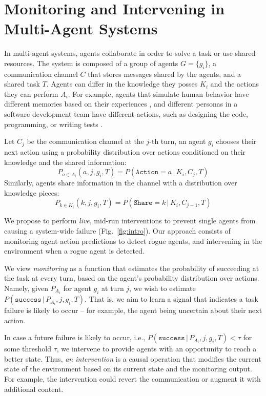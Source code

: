 \section{Monitoring and Intervening in Multi-Agent Systems}
\label{sec:method}

In multi-agent systems, agents collaborate in order to solve a task or use shared resources.
The system is composed of a group of agents $G=\{g_i\}$, a communication channel $C$ that stores messages shared by the agents, and a shared task $T$. Agents can differ in the knowledge they posses $K_i$ and the actions they can perform $A_i$. 
For example, agents that simulate human behavior have different memories based on their experiences \cite{10.1145/3586183.3606763}, and different personas in a software development team have different actions, such as designing the code, programming, or writing tests \cite{qian-etal-2024-chatdev}.

Let $C_j$ be the communication channel at the $j$-th turn, an agent $g_i$ chooses their next action using a probability distribution over actions conditioned on their knowledge and the shared information: 
\[P_{a \in A_i}(a, j, g_{i}, T)=P(\texttt{Action}=a \,|\, K_i, C_j, T)\]
Similarly, agents share information in the channel with a distribution over knowledge pieces:
\[P_{k \in K_i}(k, j, g_{i}, T)=P(\texttt{Share}=k \,|\, K_i, C_{j-1}, T)\]

We propose to perform \emph{live}, mid-run interventions to prevent single agents from causing a system-wide failure (Fig.~\ref{fig:intro}). Our approach consists of monitoring agent action predictions to detect rogue agents, and intervening in the environment when a rogue agent is detected.

We view \textit{monitoring} as a function that estimates the probability of succeeding at the task at every turn, based on the agent's probability distribution over actions.
Namely, given $P_{A_i}$ for agent $g_i$ at turn $j$, we wish to estimate $P(\texttt{success} \,|\, P_{A_i}, j, g_i, T)$. 
That is, we aim to learn a signal that indicates a task failure is likely to occur -- for example, the agent being uncertain about their next action.

In case a future failure is likely to occur, i.e., $P(\texttt{success} \,|\, P_{A_i}, j, g_i, T) < \tau$ for some threshold $\tau$, we intervene to provide agents with an opportunity to reach a better state. Thus, \textit{an intervention} is a causal operation that modifies the current state of the environment based on its current state and the monitoring output. For example, the intervention could revert the communication or augment it with additional content.


